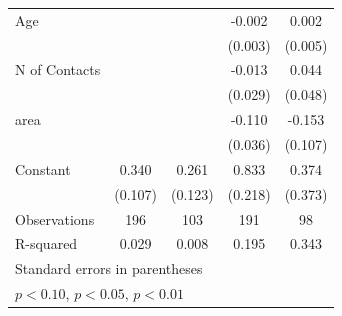 {\begin{tabular}{l*{4}{c}}
\addlinespace
Age                 &                     &                     &      -0.002         &       0.002         \\
                    &                     &                     &     (0.003)         &     (0.005)         \\
\addlinespace
N of Contacts       &                     &                     &      -0.013         &       0.044         \\
                    &                     &                     &     (0.029)         &     (0.048)         \\
\addlinespace
area                &                     &                     &      -0.110\sym{*}  &      -0.153         \\
                    &                     &                     &     (0.036)         &     (0.107)         \\
\addlinespace
Constant            &       0.340\sym{*}  &       0.261         &       0.833\sym{**} &       0.374         \\
                    &     (0.107)         &     (0.123)         &     (0.218)         &     (0.373)         \\
\midrule
Observations        &         196         &         103         &         191         &          98         \\
R-squared           &       0.029         &       0.008         &       0.195         &       0.343         \\
\bottomrule
\multicolumn{5}{l}{\footnotesize Standard errors in parentheses}\\
\multicolumn{5}{l}{\footnotesize \sym{*} \(p<0.10\), \sym{**} \(p<0.05\), \sym{***} \(p<0.01\)}\\
\end{tabular}
}
